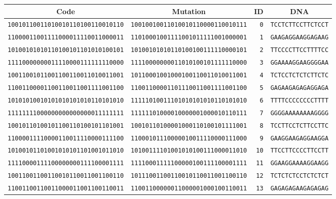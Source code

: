 \documentclass[a4paper,11pt]{article}
\begin{document}
\begin{table}[H]
\begin{center}
\small{
\begin{tabular}{ccrc} \toprule
Code & Mutation & ID & DNA \\ \midrule
\texttt{10010110011010010110100110010110} & \texttt{10010010011010010110000110010111} & \texttt{0} & \texttt{TCCTCTTCCTTCTCCT} \\
\texttt{11000011001111000011110011000011} & \texttt{11010001001111001011111001000001} & \texttt{1} & \texttt{GAAGAGGAAGGAGAAG} \\
\texttt{10100101010110100101101010100101} & \texttt{10100101010110100100111110000101} & \texttt{2} & \texttt{TTCCCCTTCCTTTTCC} \\
\texttt{11110000000011110000111111110000} & \texttt{11110000000011010100101111110000} & \texttt{3} & \texttt{GGAAAAGGAAGGGGAA} \\
\texttt{10011001011001100110011010011001} & \texttt{10110001001000100110011010011001} & \texttt{4} & \texttt{TCTCCTCTCTCTTCTC} \\
\texttt{11001100001100110011001111001100} & \texttt{11001100001101110011001111001100} & \texttt{5} & \texttt{GAGAAGAGAGAGGAGA} \\
\texttt{10101010010101010101010110101010} & \texttt{11111010011101010101010110101010} & \texttt{6} & \texttt{TTTTCCCCCCCCTTTT} \\
\texttt{11111111000000000000000011111111} & \texttt{11111101000010000001000010110111} & \texttt{7} & \texttt{GGGGAAAAAAAAGGGG} \\
\texttt{10010110100101100110100101101001} & \texttt{10010110100001000110100101111001} & \texttt{8} & \texttt{TCCTTCCTCTTCCTTC} \\
\texttt{11000011110000110011110000111100} & \texttt{11000101110000010011110000111000} & \texttt{9} & \texttt{GAAGGAAGAGGAAGGA} \\
\texttt{10100101101001010101101001011010} & \texttt{10100111101001010100111000011010} & \texttt{10} & \texttt{TTCCTTCCCCTTCCTT} \\
\texttt{11110000111100000000111100001111} & \texttt{11110001111100000100111100001111} & \texttt{11} & \texttt{GGAAGGAAAAGGAAGG} \\
\texttt{10011001100110010110011001100110} & \texttt{10111001100110010110011001100110} & \texttt{12} & \texttt{TCTCTCTCCTCTCTCT} \\
\texttt{11001100110011000011001100110011} & \texttt{11001100000011000001000100110011} & \texttt{13} & \texttt{GAGAGAGAAGAGAGAG} \\

\end{tabular}}
\end{center}
\end{table}
\end{document}

